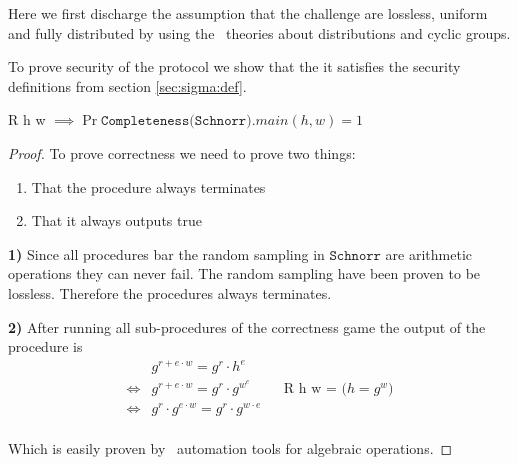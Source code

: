 Here we first discharge the assumption that the challenge are lossless, uniform
and fully distributed by using the \easycrypt\ theories about distributions and
cyclic groups.

To prove security of the protocol we show that the it satisfies the security
definitions from section \ref{sec:sigma:def}.

\begin{lemma}
  R h w $\implies \Pr{\texttt{Completeness(Schnorr)}.main(h,w)} = 1$
\end{lemma}
\begin{proof}
  To prove correctness we need to prove two things:
  \begin{enumerate}
    \item That the procedure always terminates
    \item That it always outputs true
  \end{enumerate}
  \textbf{1)} Since all procedures bar the random sampling in $\texttt{Schnorr}$ are arithmetic
  operations they can never fail. The random sampling have been proven to be
  lossless. Therefore the procedures always terminates.

  \noindent\textbf{2)} After running all sub-procedures of the correctness game
  the output of the procedure is
  \begin{align*}
         &g^{r + e \cdot w} = g^{r} \cdot h^{e} \\
    \iff &g^{r + e \cdot w} = g^{r} \cdot g^{w^{e}} && \text{R h w = ($h = g^{w}$)} \\
    \iff &g^{r} \cdot g^{e \cdot w} = g^{r} \cdot g^{w \cdot {e}} \\
  \end{align*}

  Which is easily proven by \easycrypt\ automation tools for algebraic operations.
\end{proof}

